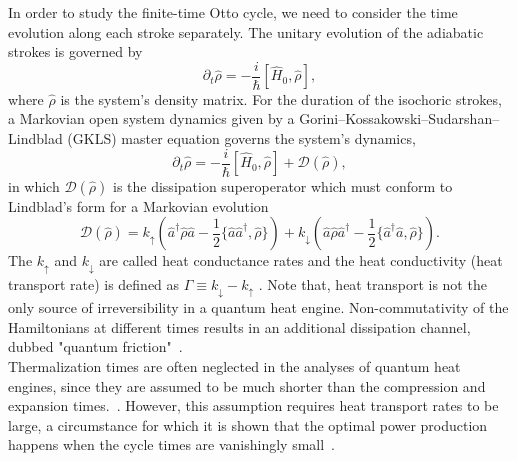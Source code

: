 \documentclass[aps,pra,twocolumn,showpacs,showkeys,groupedaddress,nobalancelastpage,nofootinbib,floatfix,superscriptaddress,longbibliography]{revtex4-2}
\begin{document}
In order to study the finite-time Otto cycle, we need to consider the time evolution along each stroke separately. The unitary evolution of the adiabatic strokes is governed by
\begin{equation}\label{unitary.dynamics}
   \partial_t\hat{\rho} = -\frac{i}{\hbar}[\hat{H}_0,\hat{\rho}],
\end{equation}
where $\hat{\rho}$ is the system's density matrix. For the duration of the isochoric strokes, a Markovian open system dynamics given by a Gorini–Kossakowski–Sudarshan–Lindblad (GKLS) master equation governs the system's dynamics,
\begin{equation}\label{lindblad.dynamics}
   \partial_t\hat{\rho} = -\frac{i}{\hbar}[\hat{H}_0,\hat{\rho}] + \mathcal{D}(\hat{\rho}),
\end{equation}
in which $\mathcal{D}(\hat{\rho})$ is the dissipation superoperator which must conform to Lindblad’s form for a Markovian evolution
 \begin{equation}\label{lindblad.diss}
   \mathcal{D}(\hat{\rho}) =  k_{\uparrow } (\hat{a}^\dagger \hat{\rho} \hat{a} - \frac{1}{2}\{\hat{a} \hat{a}^\dagger, \hat{\rho}\})+ k_{\downarrow } (\hat{a} \hat{\rho} \hat{a}^\dagger - \frac{1}{2}\{\hat{a}^\dagger \hat{a}, \hat{\rho}\}).
 \end{equation}
The $ k_{\uparrow }$ and $ k_{\downarrow }$ are called heat conductance rates and the heat conductivity (heat transport rate) is defined as $\Gamma \equiv k_{\downarrow }-k_{\uparrow }$ \cite{Kosloff2017TheQH}. Note that, heat transport is not the only source of irreversibility in a quantum heat engine. Non-commutativity of the Hamiltonians at different times results in an additional dissipation channel, dubbed "quantum friction"~\cite{PhysRevE.65.055102}.\\

Thermalization times are often neglected in the analyses of quantum heat engines, since they are assumed to be much shorter than the compression and expansion times.~\cite{PhysRevLett.112.030602,PhysRevE.98.032121,PhysRevE.99.022110,PhysRevE.99.032108,e18050168}. However, this assumption requires heat transport rates to be large, a circumstance for which it is shown that the optimal power production happens when the cycle times are vanishingly small~\cite{10.1119/1.18197,Rezek_2006,Kosloff2017TheQH}.\\
\end{document}
